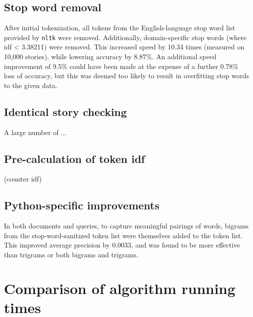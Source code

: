 \documentclass{article}
\begin{document}
\subsection{Stop word removal}
After initial tokenization, all tokens from the English-language stop word list provided by \texttt{nltk} were removed. Additionally, domain-specific stop words (where idf < 3.38211) were removed. This increased speed by 10.34 times (measured on 10,000 stories), while lowering accuracy by 8.87\%. An additional speed improvement of 9.5\% could have been made at the expense of a further 0.78\% loss of accuracy, but this was deemed too likely to result in overfitting stop words to the given data.
\subsection{Identical story checking}
A large number of ...
\subsection{Pre-calculation of token idf}
(counter idf)
\subsection{Python-specific improvements}
In both documents and queries, to capture meaningful pairings of words, bigrams from the stop-word-sanitized token list were themselves added to the token list. This improved average precision by 0.0033, and was found to be more effective than trigrams or both bigrams and trigrams.

\section{Comparison of algorithm running times}
\end{document}
